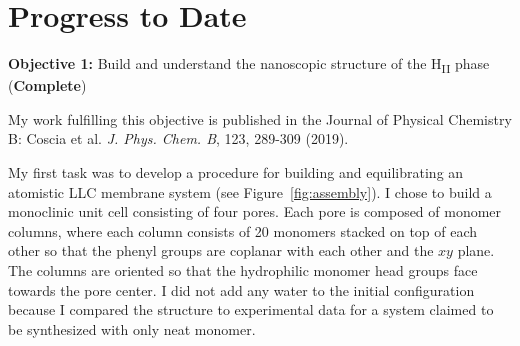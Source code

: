 \documentclass{article}
\begin{document}
  \section{Progress to Date}\label{section:progress}
  
  \textbf{\large Objective 1:} {\large Build and understand the nanoscopic structure
  of the H\textsubscript{II} phase} (\textcolor{green!40!olive}{\textbf{Complete}})
  
  \noindent My work fulfilling this objective is published in the Journal of Physical 
  Chemistry B: Coscia et al. \textit{J. Phys. Chem. B}, 123, 289-309 (2019).

  My first task was to develop a procedure for building and equilibrating 
  an atomistic LLC membrane system (see Figure~\ref{fig:assembly}). I chose to build
  a monoclinic unit cell consisting of four pores. Each pore is composed of monomer
  columns, where each column consists of 20 monomers stacked on top of each other
  so that the phenyl groups are coplanar with each other and the $xy$ plane. The
  columns are oriented so that the hydrophilic monomer head groups face towards
  the pore center. I did not add any water to the initial configuration because I
  compared the structure to experimental data for a system claimed to be
  synthesized with only neat monomer. 
  

\end{document}

